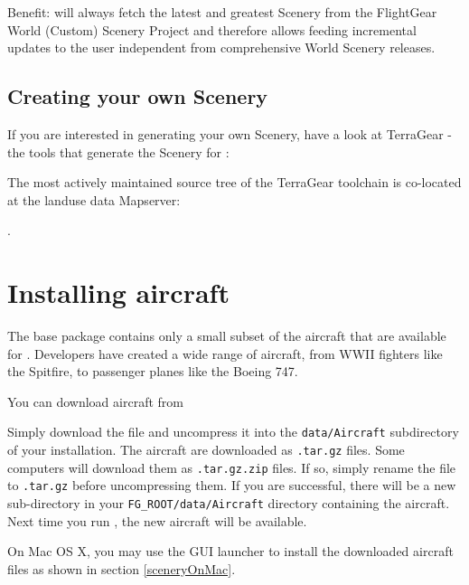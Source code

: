 Benefit: \TerraSync{} will always fetch the latest and greatest Scenery
from the FlightGear World (Custom) Scenery Project and therefore allows
feeding incremental updates to the user independent from comprehensive
World Scenery releases.

\subsection{Creating your own Scenery}

If you are interested in generating your own Scenery, have a look at TerraGear -
the tools that generate the Scenery for \FlightGear{}:

\medskip
{}
\medskip

The most actively maintained source tree of the TerraGear toolchain is
co-located at the \FlightGear{} landuse data Mapserver:

\medskip
{}.
\medskip

\section{Installing aircraft}\label{install_aircraft}

The base \FlightGear{} package contains only a small subset of the aircraft that are available for \FlightGear{}.
Developers have created a wide range of aircraft, from WWII fighters like the Spitfire, to passenger planes like the Boeing 747.

You can download aircraft from

\medskip
{}
\medskip

Simply download the file and uncompress it into the
\texttt{data/Aircraft} subdirectory of your installation. The
aircraft are downloaded as \texttt{.tar.gz} files. Some computers will download
them as \texttt{.tar.gz.zip} files. If so, simply rename the file to
\texttt{.tar.gz} before uncompressing them. If you are successful, there will be a new
sub-directory in your \texttt{FG\_ROOT/data/Aircraft} directory containing the
aircraft. Next time you run \FlightGear{}, the new aircraft will be available. 

On Mac OS X, you may use the GUI launcher to install the downloaded aircraft files as shown in section \ref{sceneryOnMac}. 
 

